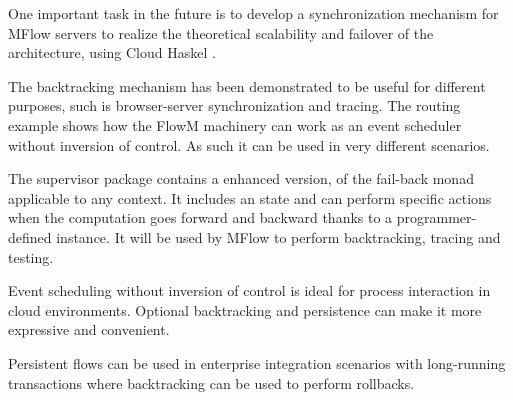 \documentclass{tmr}
\begin{document}
One important task in the future is to develop a synchronization mechanism for MFlow servers to realize the theoretical scalability and failover of the architecture, using Cloud Haskel \cite{auth:cloudhaskell}.  
  
The backtracking mechanism has been demonstrated to be useful for different purposes, such is browser-server synchronization and tracing. The routing example shows how the FlowM machinery can work as an event scheduler without inversion of control.  As such it can be used in very different scenarios. 

The supervisor package \cite{auth:supervisor} contains a enhanced version, of the fail-back monad applicable to any context. It includes an state and can perform specific actions when the computation goes forward and backward thanks to a programmer-defined instance. It will be used by MFlow to perform backtracking, tracing and testing.


Event scheduling without inversion of control is ideal for process interaction in cloud environments\cite{auth:scalacloud}. Optional backtracking and persistence can make it more expressive and convenient.  
  
Persistent flows can be used in enterprise integration scenarios  \cite{auth:integration} with long-running transactions where backtracking can be used to perform rollbacks.
  
  
  
  
\end{document}

